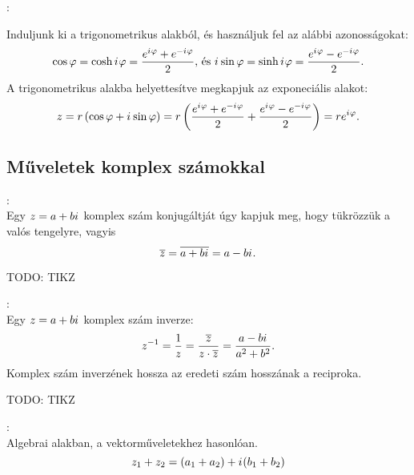\documentclass[a4paper, 12pt]{scrartcl}
\begin{document}
\begin{blueBox}
  :

  Induljunk ki a trigonometrikus alakból, és használjuk fel az alábbi
  azonosságokat:
  \[
    \cos \varphi     = \cosh {i\mkern1mu} \varphi = \frac{e^{{i\mkern1mu} \varphi} + e^{-{i\mkern1mu} \varphi}}{2}
    \text{, és }
    {i\mkern1mu} \sin \varphi = \sinh {i\mkern1mu} \varphi = \frac{e^{{i\mkern1mu} \varphi} - e^{-{i\mkern1mu} \varphi}}{2}
    \text.
  \]
  A trigonometrikus alakba helyettesítve megkapjuk az exponeciális alakot:
  \[
    z
    = \rcisrad*{r}{\varphi}
    = r \left(
    \frac{e^{\iu \varphi} + e^{-\iu \varphi}}{2}
    + \frac{e^{\iu \varphi} - e^{-\iu \varphi}}{2}
    \right)
    = r e^{\iu \varphi}
    \text.
  \]
\end{blueBox}

\subsection{Műveletek komplex számokkal}

\begin{blueBox}
  \begin{minipage}{.6\textwidth}
    :
    \\[3mm]
    Egy $z = a + b {i\mkern1mu}$ komplex szám konjugáltját úgy kapjuk meg, hogy
    tükrözzük a valós tengelyre, vagyis
    \[
      \overline z
      = \overline{a + b {i\mkern1mu}}
      = a - b{i\mkern1mu}
      \text.
    \]
  \end{minipage}\begin{minipage}{.4\textwidth}
    \centering
    TODO: TIKZ
  \end{minipage}
\end{blueBox}

\begin{blueBox}
  \begin{minipage}{.6\textwidth}
    :
    \\[3mm]
    Egy $z = a + b {i\mkern1mu}$ komplex szám inverze:
    \[
      z^{-1}
      = \frac{1}{z}
      = \frac{\overline z}{z \cdot \overline z}
      = \frac{a - b{i\mkern1mu}}{a^2 + b^2}
      \text.
    \]
    Komplex szám inverzének hossza az eredeti szám hosszának a reciproka.
  \end{minipage}\begin{minipage}{.4\textwidth}
    \centering
    TODO: TIKZ
  \end{minipage}
\end{blueBox}

\begin{blueBox}
  \begin{minipage}{.6\textwidth}
    :
    \\[3mm]
    Algebrai alakban, a vektorműveletekhez hasonlóan.
    \[
      z_1 + z_2 = (a_1 + a_2) + {i\mkern1mu} (b_1 + b_2)
    \]
  \end{minipage}\begin{minipage}{.4\textwidth}
    \centering
  \end{minipage}
\end{blueBox}
\end{document}
